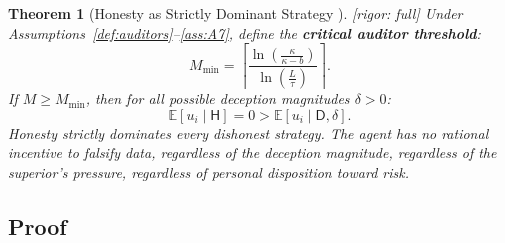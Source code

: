 \documentclass[11pt,a4paper]{article}
\newtheorem{theorem}{Theorem}[section]
\theoremstyle{definition}
\theoremstyle{remark}
\newcommand{\rigorFull}{\textcolor{green!60!black}{[rigor: full]}}
\newcommand{\E}{\mathbb{E}}
\newcommand{\honest}{\mathsf{H}}
\newcommand{\dishonest}{\mathsf{D}}
\newcommand{\deception}{\delta}
\newcommand{\threshold}{\tau}
\newcommand{\tol}{L}
\newcommand{\cost}{\kappa}
\begin{document}
\begin{theorem}[Honesty as Strictly Dominant Strategy ]
\label{thm:dominance}
\rigorFull
Under Assumptions~\ref{def:auditors}--\ref{ass:A7}, define the \textbf{critical auditor threshold}:
\begin{equation}
    M_{\min} = \left\lceil \frac{\ln\left(\frac{\cost}{\cost - b}\right)}{\ln\left(\frac{\tol}{\threshold}\right)} \right\rceil.
    \label{eq:Mmin}
\end{equation}
If $M \geq M_{\min}$, then for all possible deception magnitudes $\deception > 0$:
\begin{equation}
    \E[u_i \mid \honest] = 0 > \E[u_i \mid \dishonest, \deception].
    \label{eq:strict_dominance}
\end{equation}
Honesty strictly dominates every dishonest strategy. The agent has no rational incentive to falsify data, regardless of the deception magnitude, regardless of the superior's pressure, regardless of personal disposition toward risk.
\end{theorem}

\subsection{Proof}
\end{document}
